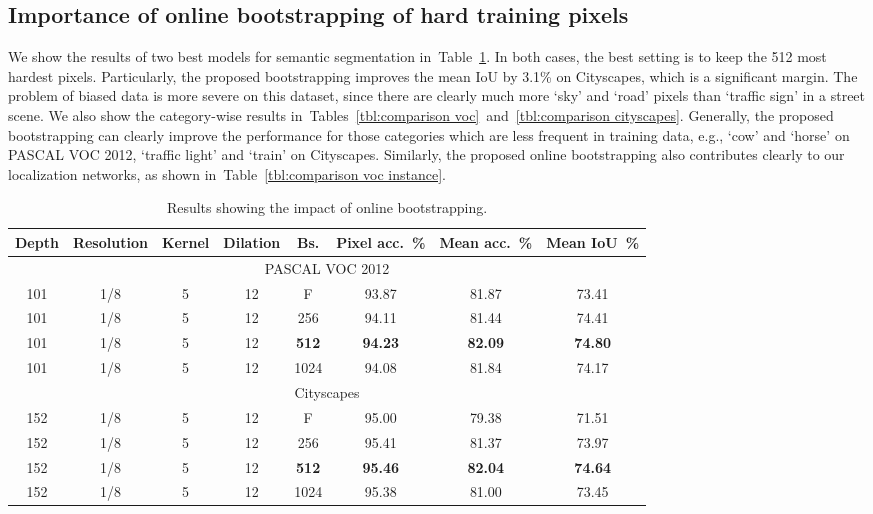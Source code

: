 \documentclass{article}
\begin{document}
\subsection{Importance of online bootstrapping of hard training pixels}
We show the results of two best models for semantic segmentation in~Table~\ref{tbl:bootstrapping}.
In both cases, the best setting is to keep the 512 most hardest pixels.
Particularly, the proposed bootstrapping improves the mean IoU by 3.1\% on Cityscapes, which is a  significant margin.
The problem of biased data is more severe on this dataset, since there are clearly much more `sky' and `road' pixels than `traffic sign' in a street scene.
We also show the category-wise results in~Tables~\ref{tbl:comparison voc}~and~\ref{tbl:comparison cityscapes}.
Generally, the proposed bootstrapping can clearly improve the performance for those categories which are less frequent in training data, e.g., `cow' and `horse' on PASCAL VOC 2012, `traffic light' and `train' on Cityscapes.
Similarly, the proposed online bootstrapping also contributes clearly to our localization networks, as shown in~Table~\ref{tbl:comparison voc instance}.


\begin{table}[h]
\caption{Results showing the impact of online bootstrapping.}
\label{tbl:bootstrapping}
\centering
\small
\resizebox{0.95\textwidth}{!}
{
\begin{tabular}{ccccc|ccc}
\toprule
Depth & Resolution & Kernel & Dilation & Bs. & Pixel acc.~\% & Mean acc.~\% & Mean IoU~\% \\
\hline\hline
\multicolumn{8}{c}{PASCAL VOC 2012} \\
\hline\hline
101 & 1/8 & 5 & 12 & F & 93.87 & 81.87 & 73.41 \\
\hline
101 & 1/8 & 5 & 12 & 256 & 94.11 & 81.44 & 74.41 \\
101 & 1/8 & 5 & 12 & \textbf{512} & \textbf{94.23} & \textbf{82.09} & \textbf{74.80} \\
101 & 1/8 & 5 & 12 & 1024 & 94.08 & 81.84 & 74.17 \\
\hline
\multicolumn{8}{c}{Cityscapes} \\
\hline\hline
152 & 1/8 & 5 & 12 & F & 95.00 & 79.38 & 71.51 \\
\hline
152 & 1/8 & 5 & 12 & 256 & 95.41 & 81.37 & 73.97 \\
152 & 1/8 & 5 & 12 & \textbf{512} & \textbf{95.46} & \textbf{82.04} & \textbf{74.64} \\
152 & 1/8 & 5 & 12 & 1024 & 95.38 & 81.00 & 73.45 \\
\bottomrule
\end{tabular}
}
\end{table}
\end{document}
